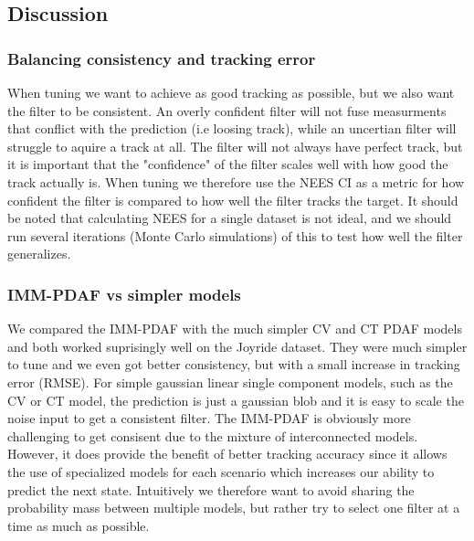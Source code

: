 \subsection{Discussion}
\subsubsection{Balancing consistency and tracking error}
When tuning we want to achieve as good tracking as possible, but we also want the filter to be consistent. An overly confident filter will not fuse measurments that conflict with the prediction (i.e loosing track), while an uncertian filter will struggle to aquire a track at all. The filter will not always have perfect track, but it is important that the "confidence" of the filter scales well with how good the track actually is.
When tuning we therefore use the NEES CI as a metric for how confident the filter is compared to how well the filter tracks the target. It should be noted that calculating NEES for a single dataset is not ideal, and we should run several iterations (Monte Carlo simulations) of this to test how well the filter generalizes.

\subsubsection{IMM-PDAF vs simpler models} \label{whyimmpdaf}
We compared the IMM-PDAF with the much simpler CV and CT PDAF models and both worked suprisingly well on the Joyride dataset. They were much simpler to tune and we even got better consistency, but with a small increase in tracking error (RMSE). For simple gaussian linear single component models, such as the CV or CT model, the prediction is just a gaussian blob and it is easy to scale the noise input to get a consistent filter. The IMM-PDAF is obviously more challenging to get consisent due to the mixture of interconnected models. However, it does provide the benefit of better tracking accuracy since it allows the use of specialized models for each scenario which increases our ability to predict the next state. Intuitively we therefore want to avoid sharing the probability mass between multiple models, but rather try to select one filter at a time as much as possible.
